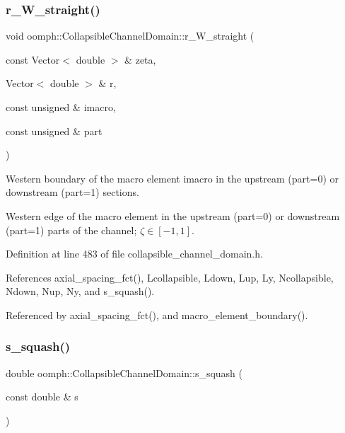 \subsubsection{\texorpdfstring{r\+\_\+\+W\+\_\+straight()}{r\_W\_straight()}}
{\footnotesize\ttfamily void oomph\+::\+Collapsible\+Channel\+Domain\+::r\+\_\+\+W\+\_\+straight (\begin{DoxyParamCaption}\item[{const Vector$<$ double $>$ \&}]{zeta,  }\item[{Vector$<$ double $>$ \&}]{r,  }\item[{const unsigned \&}]{imacro,  }\item[{const unsigned \&}]{part }\end{DoxyParamCaption})\hspace{0.3cm}{\ttfamily [private]}}



Western boundary of the macro element imacro in the upstream (part=0) or downstream (part=1) sections. 

Western edge of the macro element in the upstream (part=0) or downstream (part=1) parts of the channel; $ \zeta \in [-1,1] $. 

Definition at line 483 of file collapsible\+\_\+channel\+\_\+domain.\+h.



References axial\+\_\+spacing\+\_\+fct(), Lcollapsible, Ldown, Lup, Ly, Ncollapsible, Ndown, Nup, Ny, and s\+\_\+squash().



Referenced by axial\+\_\+spacing\+\_\+fct(), and macro\+\_\+element\+\_\+boundary().

\mbox{\label{classoomph_1_1CollapsibleChannelDomain_a638fd3959b72ef3287615f2b0f968e33}} 
\subsubsection{\texorpdfstring{s\+\_\+squash()}{s\_squash()}}
{\footnotesize\ttfamily double oomph\+::\+Collapsible\+Channel\+Domain\+::s\+\_\+squash (\begin{DoxyParamCaption}\item[{const double \&}]{s }\end{DoxyParamCaption})\hspace{0.3cm}{\ttfamily [inline]}}




